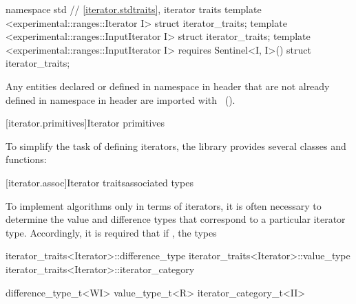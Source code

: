 \begin{addedblock}
\begin{codeblock}
namespace std {
  // \ref{iterator.stdtraits}, iterator traits
  template <experimental::ranges::Iterator I>
    struct iterator_traits;
  template <experimental::ranges::InputIterator I>
    struct iterator_traits;
  template <experimental::ranges::InputIterator I>
      requires Sentinel<I, I>()
    struct iterator_traits;
}
\end{codeblock}

\pnum
Any entities declared or defined in namespace  in header 
that are not already defined in namespace  in header
 are imported with
~(). 
\end{addedblock}

[iterator.primitives]{Iterator primitives}

\pnum
To simplify the task of defining iterators, the library provides
several classes and functions:

[iterator.assoc]{Iterator \textcolor{remclr}{traits}\textcolor{addclr}{associated types}}

\pnum
To implement algorithms only in terms of iterators, it is often necessary to
determine the value and
difference types that correspond to a particular iterator type.
Accordingly, it is required that if
, the types

\begin{removedblock}
\begin{codeblock}
iterator_traits<Iterator>::difference_type
iterator_traits<Iterator>::value_type
iterator_traits<Iterator>::iterator_category
\end{codeblock}
\end{removedblock}
\begin{addedblock}
\begin{codeblock}
difference_type_t<WI>
value_type_t<R>
iterator_category_t<II>
\end{codeblock}
\end{addedblock}

